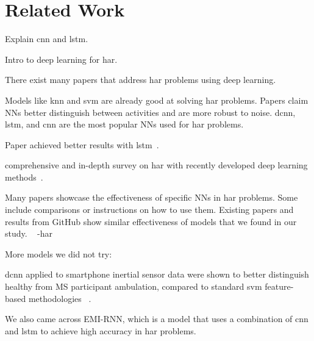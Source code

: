 \section{Related Work}\label{sec:related-work}

Explain \gls{cnn} and \gls{lstm}.

Intro to deep learning for \gls{har}.~\cite{Brownlee2019mlmastery}

There exist many papers that address \gls{har} problems using deep learning.

Models like \gls{knn} and \gls{svm} are already good at solving \gls{har} problems.
Papers claim NNs better distinguish between activities and are more robust to noise.
\gls{dcnn}, \gls{lstm}, and \gls{cnn} are the most popular NNs used for \gls{har} problems.

Paper achieved better results with \gls{lstm}~\cite{zhao2018deep}.

comprehensive and in-depth survey on \gls{har} with recently developed deep learning methods~\cite{gu2021survey}.

Many papers showcase the effectiveness of specific NNs in \gls{har} problems.
Some include comparisons or instructions on how to use them.
Existing papers and results from GitHub show similar effectiveness of models that we found in our study.
~\cite{watanabeGitHub,pailaGithub,bradwayGitHub}
-\gls{har}

More models we did not try:

\gls{dcnn} applied to smartphone inertial sensor data were shown to better distinguish healthy from MS participant ambulation, compared to standard \gls{svm} feature-based methodologies
~\cite{creagh2021dcnn}.

We also came across EMI-RNN, which is a model that uses a combination of \gls{cnn} and \gls{lstm} to achieve high accuracy in \gls{har} problems.~\cite{dennis2018emirnn}
